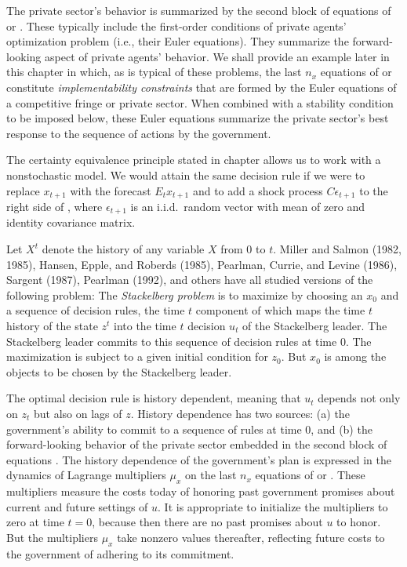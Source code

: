 The private sector's  behavior is summarized by the second
block of equations of   or . These
typically include the first-order conditions
of private  agents' optimization problem (i.e., their Euler equations). They
summarize the forward-looking aspect of private agents' behavior.
We shall provide an example later in this chapter in which, as is typical
of these problems,
the last $n_x$ equations
of  or  constitute {\it implementability constraints} that
 are formed by the Euler equations  of a competitive fringe or
private sector.
When combined with a stability condition to be imposed below, these
Euler equations
summarize the private sector's best response to the
sequence of actions by the government.

The   certainty equivalence principle
stated in chapter  allows us
to  work with a nonstochastic model.
 We would attain the
same decision rule   if we were  to replace
$x_{t+1}$ with the forecast $E_t x_{t+1}$ and to add  a shock process
$C \epsilon_{t+1}$ to the right side of , where
$\epsilon_{t+1}$ is an i.i.d.\ random vector
 with mean of  zero
and identity covariance matrix.

Let $X^t$ denote the history of any variable $X$  from
$0$ to $t$. Miller and Salmon (1982, 1985),
Hansen, Epple, and Roberds (1985), Pearlman, Currie, and Levine (1986),
Sargent (1987),
Pearlman (1992), and others have all studied
versions of the following problem:
\medskip
{}
The  {\it
 Stackelberg problem\/}
is to  maximize  by choosing an $x_0$ and
 a sequence of decision rules, the time $t$ component of which
maps the time $t$ history of the state
$z^t$ into the time $t$ decision $u_t$ of the Stackelberg leader.
   The Stackelberg leader commits to
this sequence of decision  rules at time $0$.
The maximization is subject to a given initial condition
for $z_0$.  But $x_0$ is among the objects  to be chosen by the Stackelberg leader.

\medskip
The  optimal decision rule  is history dependent, meaning that
$u_t$ depends not only on $z_t$ but also on lags of $z$.
 History
dependence has two sources: (a) the government's
ability to commit
 to a sequence of rules at time
$0$, and
(b) the forward-looking behavior of the
private sector embedded in the second block of equations
.
The history dependence of the
government's plan is expressed in the dynamics of Lagrange multipliers $\mu_x$
on the last $n_x$ equations of   or .  These
multipliers measure the costs today of honoring past government
promises about current and
future settings
of $u$.  It is appropriate to initialize
the multipliers to zero at time $t=0$, because then there are no past
promises about $u$ to honor.   But the multipliers $\mu_x$
take nonzero values thereafter, reflecting
future costs to the government of adhering to
its commitment.

